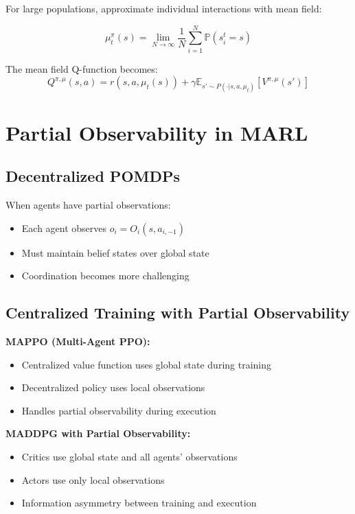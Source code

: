 For large populations, approximate individual interactions with mean field:

\begin{equation}
\mu^{\pi}_t(s) = \lim_{N \to \infty} \frac{1}{N} \sum_{i=1}^N \mathbb{P}(s_i^t = s)
\end{equation}

The mean field Q-function becomes:
\begin{equation}
Q^{\pi, \mu}(s, a) = r(s, a, \mu_t(s)) + \gamma \mathbb{E}_{s' \sim P(\cdot|s,a,\mu_t)} [V^{\pi, \mu}(s')]
\end{equation}

\section{Partial Observability in MARL}

\subsection{Decentralized POMDPs}

When agents have partial observations:
\begin{itemize}
    \item Each agent observes $o_i = O_i(s, a_{i,-1})$
    \item Must maintain belief states over global state
    \item Coordination becomes more challenging
\end{itemize}

\subsection{Centralized Training with Partial Observability}

\textbf{MAPPO (Multi-Agent PPO):}
\begin{itemize}
    \item Centralized value function uses global state during training
    \item Decentralized policy uses local observations
    \item Handles partial observability during execution
\end{itemize}

\textbf{MADDPG with Partial Observability:}
\begin{itemize}
    \item Critics use global state and all agents' observations
    \item Actors use only local observations
    \item Information asymmetry between training and execution
\end{itemize}

